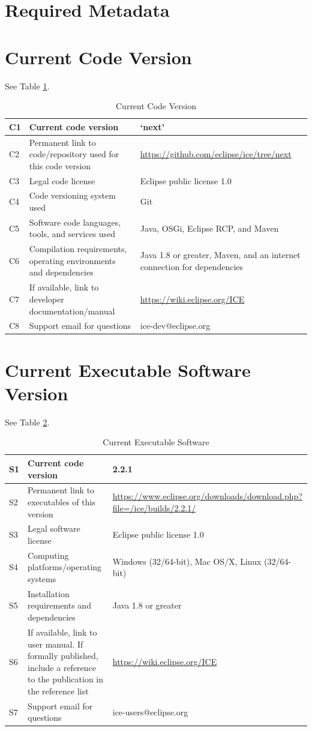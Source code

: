 \section*{Required Metadata}\label{required-metadata}

\section*{Current Code Version}\label{current-code-version}

See Table \ref{codeTable}.

\begin{table}[H]
\begin{tabularx}{\textwidth}{|l|X|X|}
\hline
C1 & Current code version & `next'\tabularnewline\hline
C2 & Permanent link to code/repository used for this code version &
\url{https://github.com/eclipse/ice/tree/next}
\tabularnewline\hline
C3 & Legal code license & Eclipse public license 1.0 \tabularnewline\hline
C4 & Code versioning system used & Git \tabularnewline\hline
C5 & Software code languages, tools, and services used & Java, OSGi, Eclipse RCP,
and Maven \tabularnewline\hline
C6 & Compilation requirements, operating environments and dependencies & Java 1.8 or greater, Maven, and
an internet connection for dependencies \tabularnewline\hline 
C7 & If available, link to developer documentation/manual &
\url{https://wiki.eclipse.org/ICE} \tabularnewline\hline 
C8 & Support email for questions & ice-dev@eclipse.org \tabularnewline\hline
\end{tabularx}
\caption{Current Code Version}
\label{codeTable}
\end{table}

\section*{Current Executable Software
Version}\label{current-executable-software-version}

See Table \ref{execTable}.

\begin{table}[H]
\begin{tabularx}{\textwidth}{|l|X|X|}
\hline
S1 & Current code version & 2.2.1 \tabularnewline\hline
S2 & Permanent link to executables of this version &
\url{https://www.eclipse.org/downloads/download.php?file=/ice/builds/2.2.1/}
 \tabularnewline\hline 
S3 & Legal software license & Eclipse public license 1.0 \tabularnewline\hline
S4 & Computing platforms/operating systems & Windows (32/64-bit), Mac OS/X,
Linux (32/64-bit) \tabularnewline\hline 
S5 & Installation requirements and dependencies & Java 1.8 or
greater \tabularnewline\hline
S6 & If available, link to user manual. If formally published, include a
reference to the publication in the reference list &
\url{https://wiki.eclipse.org/ICE} \tabularnewline\hline 
S7 & Support email for questions & ice-users@eclipse.org \tabularnewline\hline
\end{tabularx}
\caption{Current Executable Software}
\label{execTable}
\end{table}